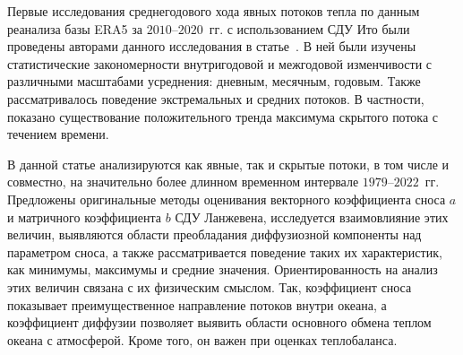 


Первые исследования среднегодового хода явных потоков тепла по данным реанализа базы ERA5 за $2010$--$2020$~гг. с использованием СДУ Ито были проведены авторами данного исследования в статье~\cite{Belyaev2021}. В ней были изучены статистические закономерности внутригодовой и межгодовой изменчивости с различными масштабами усреднения: дневным, месячным, годовым. Также рассматривалось поведение экстремальных и средних потоков. В частности, показано существование положительного тренда максимума скрытого потока с течением времени. 

В данной статье анализируются как явные, так и скрытые потоки, в том числе и совместно, на значительно более длинном временном интервале $1979$--$2022$~гг. Предложены оригинальные методы оценивания векторного коэффициента сноса $a$ и матричного коэффициента $b$ СДУ Ланжевена, исследуется взаимовлияние этих величин, выявляются области преобладания диффузиозной компоненты над параметром сноса, а также рассматривается поведение таких их характеристик, как минимумы, максимумы и средние значения.
Ориентированность на анализ этих величин связана с их физическим смыслом. Так, коэффициент сноса показывает преимущественное направление потоков внутри океана, а коэффициент диффузии позволяет выявить области основного обмена теплом океана с атмосферой. Кроме того, он важен при оценках теплобаланса.

